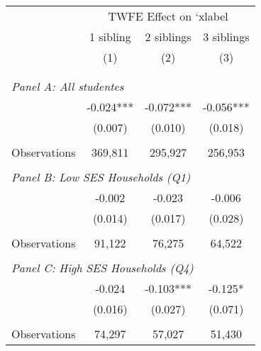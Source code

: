 \makeatletter
{}
{
\makeatother
\begin{tabular}{lccc}
\toprule
\cmidrule(lr){2-4}
& \multicolumn{3}{c}{TWFE Effect on `xlabel} \\
\cmidrule(lr){2-4}
& 1 sibling & 2 siblings & 3 siblings  \\
\cmidrule(lr){2-2} \cmidrule(lr){3-3} \cmidrule(lr){4-4}
& (1) & (2) & (3)\\
\bottomrule
&  &  &  \\
&  &  &   \\
\multicolumn{4}{l}{\textit{Panel A: All studentes}} \\
\hspace{3mm}        &      -0.024***&      -0.072***&      -0.056***\\
                    &     (0.007)   &     (0.010)   &     (0.018)   \\
                    &               &               &               \\
\hspace{3mm}Observations&     369,811   &     295,927   &     256,953   \\
 
&  &  &   \\
\multicolumn{4}{l}{\textit{Panel B: Low SES Households (Q1)}} \\
\hspace{3mm}        &      -0.002   &      -0.023   &      -0.006   \\
                    &     (0.014)   &     (0.017)   &     (0.028)   \\
                    &               &               &               \\
\hspace{3mm}Observations&      91,122   &      76,275   &      64,522   \\
 
&  &  &   \\
\multicolumn{4}{l}{\textit{Panel C: High SES Households (Q4)}} \\
\hspace{3mm}        &      -0.024   &      -0.103***&      -0.125*  \\
                    &     (0.016)   &     (0.027)   &     (0.071)   \\
                    &               &               &               \\
\hspace{3mm}Observations&      74,297   &      57,027   &      51,430   \\
 

\end{tabular}}
